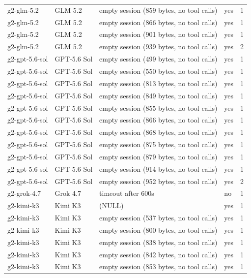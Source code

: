 \begin{tabular}{lllll}
g2-glm-5.2 & GLM 5.2 & empty session (859 bytes, no tool calls) & yes & 1 \\
g2-glm-5.2 & GLM 5.2 & empty session (866 bytes, no tool calls) & yes & 1 \\
g2-glm-5.2 & GLM 5.2 & empty session (901 bytes, no tool calls) & yes & 1 \\
g2-glm-5.2 & GLM 5.2 & empty session (939 bytes, no tool calls) & yes & 2 \\
g2-gpt-5.6-sol & GPT-5.6 Sol & empty session (499 bytes, no tool calls) & yes & 1 \\
g2-gpt-5.6-sol & GPT-5.6 Sol & empty session (550 bytes, no tool calls) & yes & 1 \\
g2-gpt-5.6-sol & GPT-5.6 Sol & empty session (813 bytes, no tool calls) & yes & 1 \\
g2-gpt-5.6-sol & GPT-5.6 Sol & empty session (849 bytes, no tool calls) & yes & 1 \\
g2-gpt-5.6-sol & GPT-5.6 Sol & empty session (855 bytes, no tool calls) & yes & 1 \\
g2-gpt-5.6-sol & GPT-5.6 Sol & empty session (866 bytes, no tool calls) & yes & 1 \\
g2-gpt-5.6-sol & GPT-5.6 Sol & empty session (868 bytes, no tool calls) & yes & 1 \\
g2-gpt-5.6-sol & GPT-5.6 Sol & empty session (875 bytes, no tool calls) & yes & 1 \\
g2-gpt-5.6-sol & GPT-5.6 Sol & empty session (879 bytes, no tool calls) & yes & 1 \\
g2-gpt-5.6-sol & GPT-5.6 Sol & empty session (914 bytes, no tool calls) & yes & 1 \\
g2-gpt-5.6-sol & GPT-5.6 Sol & empty session (952 bytes, no tool calls) & yes & 2 \\
g2-grok-4.7 & Grok 4.7 & timeout after 600s & no & 1 \\
g2-kimi-k3 & Kimi K3 & (NULL) & yes & 1 \\
g2-kimi-k3 & Kimi K3 & empty session (537 bytes, no tool calls) & yes & 1 \\
g2-kimi-k3 & Kimi K3 & empty session (800 bytes, no tool calls) & yes & 1 \\
g2-kimi-k3 & Kimi K3 & empty session (838 bytes, no tool calls) & yes & 1 \\
g2-kimi-k3 & Kimi K3 & empty session (842 bytes, no tool calls) & yes & 1 \\
g2-kimi-k3 & Kimi K3 & empty session (853 bytes, no tool calls) & yes & 1 \\

\end{tabular}
